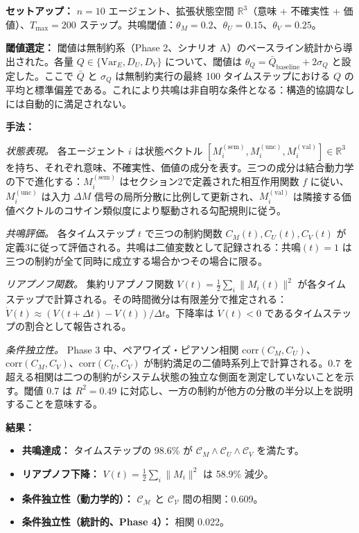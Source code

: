 \documentclass[11pt,a4paper]{article}
\theoremstyle{definition}
\begin{document}
\textbf{セットアップ：} $n = 10$ エージェント、拡張状態空間 $\mathbb{R}^3$（意味 + 不確実性 + 価値）、$T_{\max} = 200$ ステップ。共鳴閾値：$\theta_M = 0.2$、$\theta_U = 0.15$、$\theta_V = 0.25$。

\textbf{閾値選定：} 閾値は無制約系（Phase 2、シナリオ A）のベースライン統計から導出された。各量 $Q \in \{\text{Var}_E, D_U, D_V\}$ について、閾値は $\theta_Q = \bar{Q}_{\text{baseline}} + 2\sigma_Q$ と設定した。ここで $\bar{Q}$ と $\sigma_Q$ は無制約実行の最終 100 タイムステップにおける $Q$ の平均と標準偏差である。これにより共鳴は非自明な条件となる：構造的協調なしには自動的に満足されない。

\textbf{手法：}

\textit{状態表現。} 各エージェント $i$ は状態ベクトル $[M_i^{(\text{sem})}, M_i^{(\text{unc})}, M_i^{(\text{val})}] \in \mathbb{R}^3$ を持ち、それぞれ意味、不確実性、価値の成分を表す。三つの成分は結合動力学の下で進化する：$M_i^{(\text{sem})}$ はセクション2で定義された相互作用関数 $f$ に従い、$M_i^{(\text{unc})}$ は入力 $\Delta M$ 信号の局所分散に比例して更新され、$M_i^{(\text{val})}$ は隣接する価値ベクトルのコサイン類似度により駆動される勾配規則に従う。

\textit{共鳴評価。} 各タイムステップ $t$ で三つの制約関数 $C_M(t), C_U(t), C_V(t)$ が定義3に従って評価される。共鳴は二値変数として記録される：$\text{共鳴}(t) = 1$ は三つの制約が全て同時に成立する場合かつその場合に限る。

\textit{リアプノフ関数。} 集約リアプノフ関数 $V(t) = \frac{1}{2}\sum_i \|M_i(t)\|^2$ が各タイムステップで計算される。その時間微分は有限差分で推定される：$\dot{V}(t) \approx (V(t+\Delta t) - V(t))/\Delta t$。下降率は $\dot{V}(t) < 0$ であるタイムステップの割合として報告される。

\textit{条件独立性。} Phase 3 中、ペアワイズ・ピアソン相関 $\text{corr}(C_M, C_U)$、$\text{corr}(C_M, C_V)$、$\text{corr}(C_U, C_V)$ が制約満足の二値時系列上で計算される。0.7 を超える相関は二つの制約がシステム状態の独立な側面を測定していないことを示す。閾値 0.7 は $R^2 = 0.49$ に対応し、一方の制約が他方の分散の半分以上を説明することを意味する。

\textbf{結果：}
\begin{itemize}
\item \textbf{共鳴達成：} タイムステップの 98.6\% が $\mathcal{C}_M \land \mathcal{C}_U \land \mathcal{C}_V$ を満たす。
\item \textbf{リアプノフ下降：} $V(t) = \frac{1}{2}\sum_i \|M_i\|^2$ は 58.9\% 減少。
\item \textbf{条件独立性（動力学的）：} $\mathcal{C_M}$ と $\mathcal{C_V}$ 間の相関：0.609。
\item \textbf{条件独立性（統計的、Phase 4）：} 相関 0.022。
\end{itemize}
\end{document}
